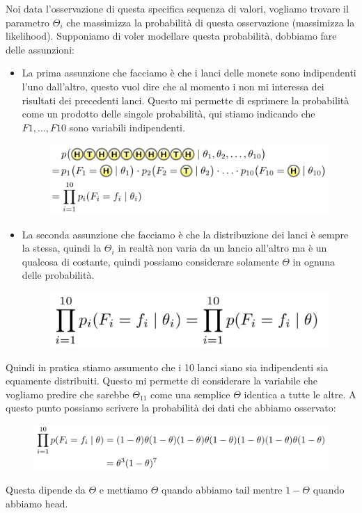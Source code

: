 \documentclass[14pt]{extreport}
\begin{document}
Noi data l'osservazione di questa specifica sequenza di valori, vogliamo trovare il parametro $\Theta_i$ che massimizza la probabilità di questa
osservazione (massimizza la likelihood). Supponiamo di voler modellare questa probabilità, dobbiamo fare delle assunzioni:
\begin{itemize}
	\item La prima assunzione che facciamo è che i lanci delle monete sono indipendenti l'uno dall'altro, questo vuol dire che al momento i non mi
	      interessa dei risultati dei precedenti lanci. Questo mi permette di esprimere la probabilità come un prodotto delle singole probabilità, qui
	      stiamo indicando che $F1,...,F10$ sono variabili indipendenti.
	      \begin{figure}[H]
		      \centering
		      \includegraphics[width=0.88\linewidth]{11.jpeg}
	      \end{figure}
	\item La seconda assunzione che facciamo è che la distribuzione dei lanci è sempre la stessa, quindi la $\Theta_i$ in realtà non varia da un
	      lancio all'altro ma è un qualcosa di costante, quindi possiamo considerare solamente $\Theta$ in ognuna delle probabilità.
	      \begin{figure}[H]
		      \centering
		      \includegraphics[width=0.5\linewidth]{13.jpeg}
	      \end{figure}
\end{itemize}
Quindi in pratica stiamo assumento che i 10 lanci siano sia indipendenti sia equamente distribuiti. Questo mi permette di considerare la variabile che
vogliamo predire che sarebbe $\Theta_{11}$ come una semplice $\Theta$ identica a tutte le altre. A questo punto possiamo scrivere la probabilità dei
dati che abbiamo osservato:
\begin{figure}[H]
	\centering
	\includegraphics[width=0.80\linewidth]{14.jpeg}
\end{figure}
Questa dipende da $\Theta$ e mettiamo $\Theta$ quando abbiamo tail mentre $1-\Theta$ quando abbiamo head.\\
\end{document}
